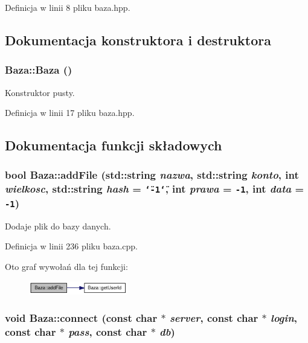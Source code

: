 Definicja w linii 8 pliku baza.hpp.

\subsection{Dokumentacja konstruktora i destruktora}
\hypertarget{a00001_8edd83a7fa98b203a1ab58157a1660a4}{
\subsubsection[{Baza}]{\setlength{\rightskip}{0pt plus 5cm}Baza::Baza ()}}
\label{d8/d84/a00001_8edd83a7fa98b203a1ab58157a1660a4}


Konstruktor pusty. 



Definicja w linii 17 pliku baza.hpp.

\subsection{Dokumentacja funkcji składowych}
\hypertarget{a00001_abbda65be49dfb28b1a578d0383599fa}{
\subsubsection[{addFile}]{\setlength{\rightskip}{0pt plus 5cm}bool Baza::addFile (std::string {\em nazwa}, \/  std::string {\em konto}, \/  int {\em wielkosc}, \/  std::string {\em hash} = {\tt \char`\"{}-1\char`\"{}}, \/  int {\em prawa} = {\tt -1}, \/  int {\em data} = {\tt -1})}}
\label{d8/d84/a00001_abbda65be49dfb28b1a578d0383599fa}


Dodaje plik do bazy danych. 



Definicja w linii 236 pliku baza.cpp.

Oto graf wywołań dla tej funkcji:\nopagebreak
\begin{figure}[H]
\begin{center}
\leavevmode
\includegraphics[width=122pt]{d8/d84/a00001_abbda65be49dfb28b1a578d0383599fa_cgraph}
\end{center}
\end{figure}
\hypertarget{a00001_bef61cc396e46d347a47c75e9ef8dfde}{
\subsubsection[{connect}]{\setlength{\rightskip}{0pt plus 5cm}void Baza::connect (const char $\ast$ {\em server}, \/  const char $\ast$ {\em login}, \/  const char $\ast$ {\em pass}, \/  const char $\ast$ {\em db})}}
\label{d8/d84/a00001_bef61cc396e46d347a47c75e9ef8dfde}



